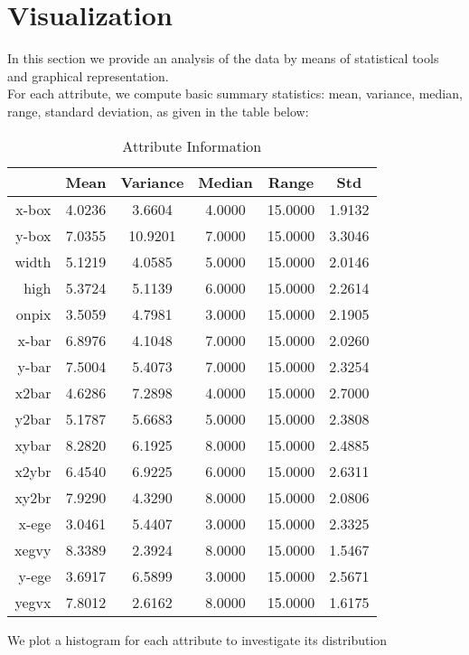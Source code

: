 \chapter*{Visualization}
In this section we provide an analysis of the data by means of statistical tools and graphical representation.\\

For each attribute, we compute basic summary statistics: mean, variance, median, range, standard deviation, as given in the table below:



\begin{table}[ht]
    \centering
    \begin{tabular}{|r|c|c|c|c|c|}
         \hline
              & Mean & Variance & Median & Range & Std \\ \hline
             x-box & 4.0236  &  3.6604 &   4.0000 &  15.0000  &  1.9132 \\ \hline
             y-box & 7.0355  & 10.9201  &  7.0000  & 15.0000  &  3.3046  \\ \hline
             width & 5.1219  &  4.0585  &  5.0000  &  15.0000  &  2.0146 \\ \hline
             high & 5.3724  &  5.1139  &  6.0000  & 15.0000  &  2.2614 \\ \hline
             onpix & 3.5059  &  4.7981  &  3.0000  & 15.0000  &  2.1905 \\ \hline
             x-bar & 6.8976  &  4.1048  &  7.0000  & 15.0000  &  2.0260  \\ \hline
             y-bar & 7.5004  &  5.4073  &  7.0000 &  15.0000  &  2.3254 \\ \hline
             x2bar & 4.6286  &  7.2898   & 4.0000  & 15.0000  &  2.7000  \\ \hline
             y2bar & 5.1787  &  5.6683   & 5.0000  & 15.0000  &  2.3808  \\ \hline
             xybar & 8.2820   & 6.1925  &  8.0000 &  15.0000  &  2.4885   \\ \hline
             x2ybr & 6.4540   & 6.9225  &  6.0000 &  15.0000  &  2.6311  \\ \hline
             xy2br & 7.9290   & 4.3290  &  8.0000  & 15.0000  &  2.0806  \\ \hline
             x-ege & 3.0461  &  5.4407  &  3.0000  & 15.0000  &  2.3325 \\ \hline
             xegvy & 8.3389   & 2.3924  &  8.0000  & 15.0000  &  1.5467 \\ \hline
             y-ege & 3.6917   & 6.5899  &  3.0000  & 15.0000  &  2.5671 \\ \hline
             yegvx & 7.8012   & 2.6162  &  8.0000  & 15.0000  &  1.6175 \\ \hline
    \end{tabular}
    \caption{Attribute Information}
\end{table}

We plot a histogram for each attribute to investigate its distribution
